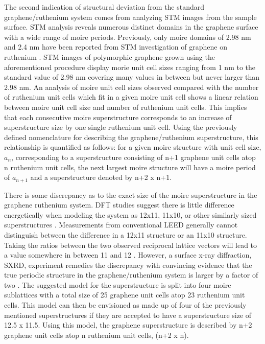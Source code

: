 The second indication of structural deviation from the standard graphene/ruthenium system comes from analyzing STM images from the sample surface. STM analysis reveals numerous distinct domains in the graphene surface with a wide range of moire periods. Previously, only moire domains of 2.98 nm and 2.4 nm have been reported from STM investigation of graphene on ruthenium \cite{march, vazquez}. STM images of polymorphic graphene grown using the aforementioned procedure display morie unit cell sizes ranging from 1 nm to the standard value of 2.98 nm covering many values in between but never larger than 2.98 nm. An analysis of moire unit cell sizes observed compared with the number of ruthenium unit cells which fit in a given moire unit cell shows a linear relation between moire unit cell size and number of ruthenium unit cells. This implies that each consecutive moire superstructure corresponds to an increase of superstructure size by one single ruthenium unit cell. Using the previously defined nomenclature for describing the graphene/ruthenium superstructure, this relationship is quantified as follows: for a given moire structure with unit cell size, $a_n$, corresponding to a superstructure consisting of n+1 graphene unit cells atop n ruthenium unit cells, the next largest moire structure will have a moire period of $a_{n+1}$ and a superstructure denoted by n+2 x n+1.

There is some discrepancy as to the exact size of the moire superstructure in the graphene ruthenium system. DFT studies suggest there is little difference energetically when modeling the system as 12x11, 11x10, or other similarly sized superstructures \cite{graphene-metals}. Measurements from conventional LEED generally cannot distinguish between the difference in a 12x11 structure or an 11x10 structure. Taking the ratios between the two observed reciprocal lattice vectors will lead to a value somewhere in between 11 and 12 \cite{graphene-metals}. However, a surface x-ray diffraction, SXRD, experiment remedies the discrepancy with convincing evidence that the true periodic structure in the graphene/ruthenium system is larger by a factor of two \cite{sxrd}. The suggested model for the superstructure is split into four moire sublattices with a total size of 25 graphene unit cells atop 23 ruthenium unit cells. This model can then be envisioned as made up of four of the previously mentioned superstructures if they are accepted to have a superstructure size of 12.5 x 11.5. Using this model, the graphene superstructure is described by n+2 graphene unit cells atop n ruthenium unit cells, (n+2 x n).

